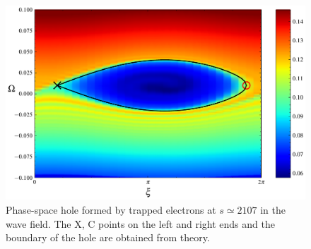 \begin{figure}[htbp]
    \centering
    \includegraphics[scale=0.5]{cpc_img/fig_hole.pdf}
    \caption{Phase-space hole  formed by trapped electrons at $s\simeq 2107$ in the wave field. The X, C points on the left and right ends and the boundary of the hole are obtained from theory.}
    \label{fig.hole}
\end{figure}


